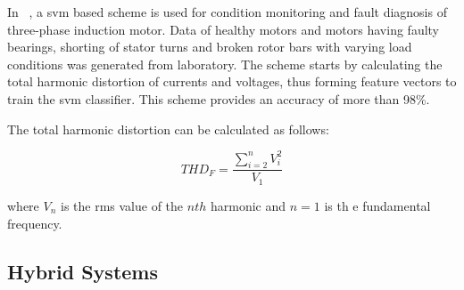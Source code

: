 
In ~\cite{Patel2016}, a \Acrshort{svm} based scheme is used for condition monitoring and fault diagnosis of three-phase induction motor. Data of healthy motors and motors having faulty bearings, shorting of stator turns and broken rotor bars with varying load conditions was generated from laboratory. The scheme starts by calculating the total harmonic distortion of currents and voltages, thus forming feature vectors to train the \Acrshort{svm} classifier. This scheme provides an accuracy of more than 98\%.

The total harmonic distortion can be calculated as follows:

\begin{equation} 
\label{eq:total_harmornic_distortion}
THD_F = \frac{\sum_{i=2}^{n} V_i^2}{V_1}  
\end{equation}

\noindent where $V_n$ is the \acrshort{rms} value of the $nth$ harmonic and $n=1$ is th e fundamental frequency.

\subsection{Hybrid Systems} %
\label{sec:other_approaches}
